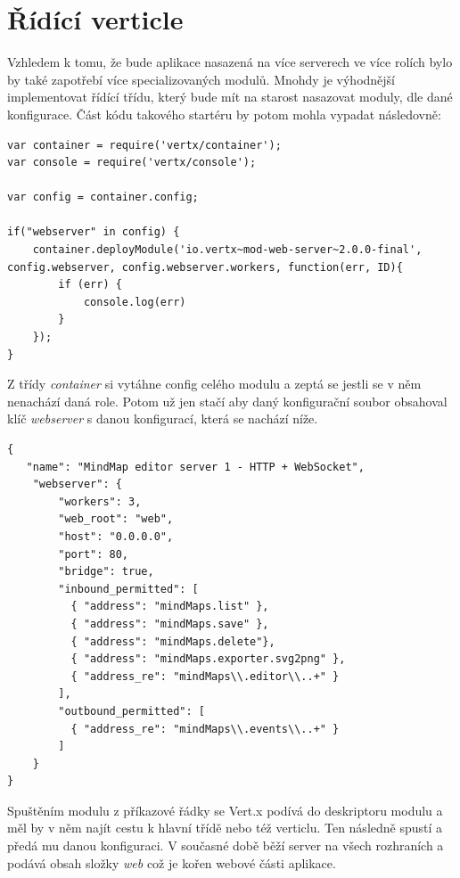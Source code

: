 \section{Řídící verticle}

Vzhledem k tomu, že bude aplikace nasazená na více serverech ve více rolích bylo by také zapotřebí více specializovaných modulů. Mnohdy je výhodnější implementovat řídící třídu, který bude mít na starost nasazovat moduly, dle dané konfigurace. Část kódu takového startéru by potom mohla vypadat následovně:

\begin{lstlisting}
var container = require('vertx/container');
var console = require('vertx/console');

var config = container.config;

if("webserver" in config) {
	container.deployModule('io.vertx~mod-web-server~2.0.0-final', config.webserver, config.webserver.workers, function(err, ID){
		if (err) {
			console.log(err)
		}
	});
}
\end{lstlisting}

Z třídy \emph{container} si vytáhne config celého modulu a zeptá se jestli se v něm nenachází daná role.
Potom už jen stačí aby daný konfigurační soubor obsahoval klíč \emph{webserver} s danou konfigurací, která se nachází níže.

\begin{lstlisting}
{
   "name": "MindMap editor server 1 - HTTP + WebSocket",
    "webserver": {
        "workers": 3,
        "web_root": "web",
        "host": "0.0.0.0",
        "port": 80,
        "bridge": true,
        "inbound_permitted": [
          { "address": "mindMaps.list" },
          { "address": "mindMaps.save" },
          { "address": "mindMaps.delete"},
          { "address": "mindMaps.exporter.svg2png" },
          { "address_re": "mindMaps\\.editor\\..+" }
        ],
        "outbound_permitted": [
          { "address_re": "mindMaps\\.events\\..+" }
        ]
    }
}
\end{lstlisting}

Spuštěním modulu z příkazové řádky se Vert.x podívá do deskriptoru modulu a měl by v něm najít cestu k hlavní třídě nebo též verticlu. Ten následně spustí a předá mu danou konfiguraci. V současné době běží server na všech rozhraních a podává obsah složky \emph{web} což je kořen webové  části aplikace.

